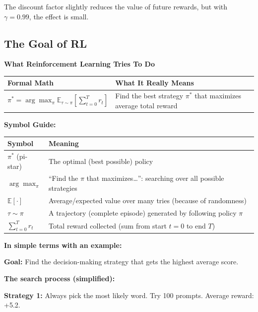\begin{chapterenv}
The discount factor slightly reduces the value of future rewards, but with $\gamma = 0.99$, the effect is small.

\subsection{The Goal of RL}

\begin{infobox}
\textbf{What Reinforcement Learning Tries To Do}

\begin{center}
\begin{tabular}{p{}p{}}
\toprule
\textbf{Formal Math} & \textbf{What It Really Means} \\
\midrule
$\pi^* = \arg\max_\pi \mathbb{E}_{\tau \sim \pi}\!\left[\sum_{t=0}^T r_t\right]$ & Find the best strategy $\pi^*$ that maximizes average total reward \\
\bottomrule
\end{tabular}
\end{center}

\textbf{Symbol Guide:}

\begin{center}
\begin{tabular}{p{}p{}}
\toprule
\textbf{Symbol} & \textbf{Meaning} \\
\midrule
$\pi^*$ (pi-star) & The optimal (best possible) policy \\
$\arg\max_\pi$ & ``Find the $\pi$ that maximizes\ldots'': searching over all possible strategies \\
$\mathbb{E}[\cdot]$ & Average/expected value over many tries (because of randomness) \\
$\tau \sim \pi$ & A trajectory (complete episode) generated by following policy $\pi$ \\
$\sum_{t=0}^T r_t$ & Total reward collected (sum from start $t=0$ to end $T$) \\
\bottomrule
\end{tabular}
\end{center}
\end{infobox}

\textbf{In simple terms with an example:}

\textbf{Goal:} Find the decision-making strategy that gets the highest average score.

\textbf{The search process (simplified):}

\textbf{Strategy 1:} Always pick the most likely word. Try 100 prompts. Average reward: +5.2.


\end{chapterenv}
